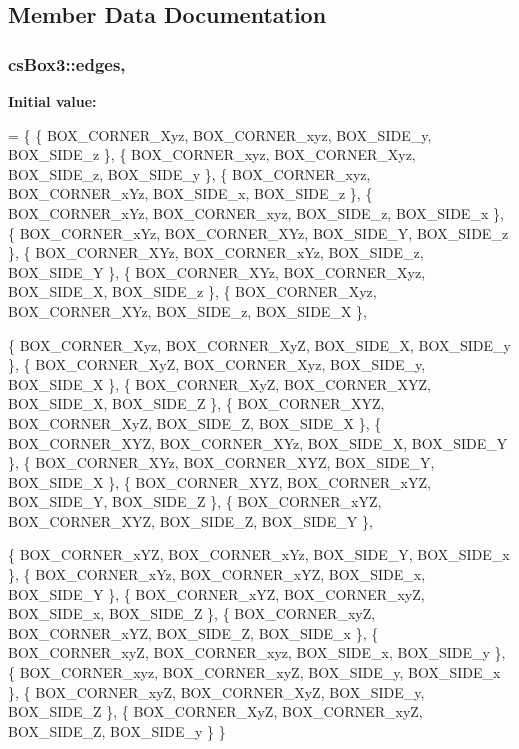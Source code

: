 \subsection{Member Data Documentation}
\subsubsection[{\texorpdfstring{edges}{edges}}]{ cs\+Box3\+::edges\hspace{0.3cm}{\ttfamily [static]}, {\ttfamily [protected]}}\hypertarget{classcsBox3_aa5d77f927fe13973395a52424cd8798f}{}\label{classcsBox3_aa5d77f927fe13973395a52424cd8798f}
{\bfseries Initial value\+:}
\begin{DoxyCode}
=
  \{
    \{ BOX\_CORNER\_Xyz, BOX\_CORNER\_xyz, BOX\_SIDE\_y, BOX\_SIDE\_z \},
    \{ BOX\_CORNER\_xyz, BOX\_CORNER\_Xyz, BOX\_SIDE\_z, BOX\_SIDE\_y \},
    \{ BOX\_CORNER\_xyz, BOX\_CORNER\_xYz, BOX\_SIDE\_x, BOX\_SIDE\_z \},
    \{ BOX\_CORNER\_xYz, BOX\_CORNER\_xyz, BOX\_SIDE\_z, BOX\_SIDE\_x \},
    \{ BOX\_CORNER\_xYz, BOX\_CORNER\_XYz, BOX\_SIDE\_Y, BOX\_SIDE\_z \},
    \{ BOX\_CORNER\_XYz, BOX\_CORNER\_xYz, BOX\_SIDE\_z, BOX\_SIDE\_Y \},
    \{ BOX\_CORNER\_XYz, BOX\_CORNER\_Xyz, BOX\_SIDE\_X, BOX\_SIDE\_z \},
    \{ BOX\_CORNER\_Xyz, BOX\_CORNER\_XYz, BOX\_SIDE\_z, BOX\_SIDE\_X \},

    \{ BOX\_CORNER\_Xyz, BOX\_CORNER\_XyZ, BOX\_SIDE\_X, BOX\_SIDE\_y \},
    \{ BOX\_CORNER\_XyZ, BOX\_CORNER\_Xyz, BOX\_SIDE\_y, BOX\_SIDE\_X \},
    \{ BOX\_CORNER\_XyZ, BOX\_CORNER\_XYZ, BOX\_SIDE\_X, BOX\_SIDE\_Z \},
    \{ BOX\_CORNER\_XYZ, BOX\_CORNER\_XyZ, BOX\_SIDE\_Z, BOX\_SIDE\_X \},
    \{ BOX\_CORNER\_XYZ, BOX\_CORNER\_XYz, BOX\_SIDE\_X, BOX\_SIDE\_Y \},
    \{ BOX\_CORNER\_XYz, BOX\_CORNER\_XYZ, BOX\_SIDE\_Y, BOX\_SIDE\_X \},
    \{ BOX\_CORNER\_XYZ, BOX\_CORNER\_xYZ, BOX\_SIDE\_Y, BOX\_SIDE\_Z \},
    \{ BOX\_CORNER\_xYZ, BOX\_CORNER\_XYZ, BOX\_SIDE\_Z, BOX\_SIDE\_Y \},

    \{ BOX\_CORNER\_xYZ, BOX\_CORNER\_xYz, BOX\_SIDE\_Y, BOX\_SIDE\_x \},
    \{ BOX\_CORNER\_xYz, BOX\_CORNER\_xYZ, BOX\_SIDE\_x, BOX\_SIDE\_Y \},
    \{ BOX\_CORNER\_xYZ, BOX\_CORNER\_xyZ, BOX\_SIDE\_x, BOX\_SIDE\_Z \},
    \{ BOX\_CORNER\_xyZ, BOX\_CORNER\_xYZ, BOX\_SIDE\_Z, BOX\_SIDE\_x \},
    \{ BOX\_CORNER\_xyZ, BOX\_CORNER\_xyz, BOX\_SIDE\_x, BOX\_SIDE\_y \},
    \{ BOX\_CORNER\_xyz, BOX\_CORNER\_xyZ, BOX\_SIDE\_y, BOX\_SIDE\_x \},
    \{ BOX\_CORNER\_xyZ, BOX\_CORNER\_XyZ, BOX\_SIDE\_y, BOX\_SIDE\_Z \},
    \{ BOX\_CORNER\_XyZ, BOX\_CORNER\_xyZ, BOX\_SIDE\_Z, BOX\_SIDE\_y \}
  \}
\end{DoxyCode}
